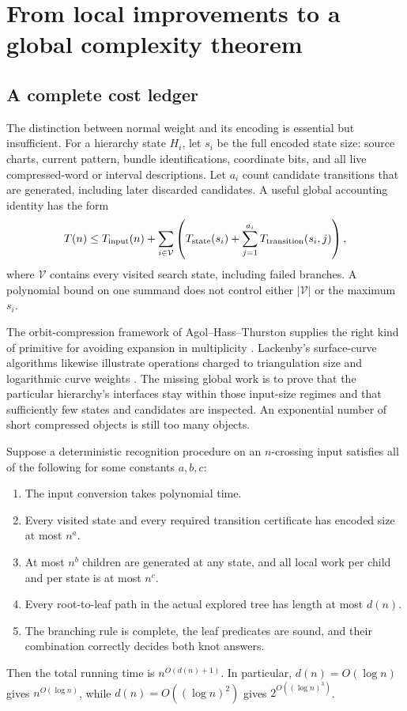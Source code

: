 \section{From local improvements to a global complexity theorem}
\label{sec:global}

\subsection{A complete cost ledger}

The distinction between normal weight and its encoding is essential but
insufficient. For a hierarchy state $H_i$, let $s_i$ be the full encoded
state size: source charts, current pattern, bundle identifications,
coordinate bits, and all live compressed-word or interval descriptions.
Let $a_i$ count candidate transitions that are generated, including later
discarded candidates. A useful global accounting identity has the form
\[
 T(n)\le T_{\rm input}(n)+
 \sum_{i\in\mathcal V}
 \left(T_{\rm state}(s_i)+
       \sum_{j=1}^{a_i}T_{\rm transition}(s_i,j)\right),
\]
where $\mathcal V$ contains every visited search state, including failed
branches. A polynomial bound on one summand does not control either
$|\mathcal V|$ or the maximum $s_i$.

The orbit-compression framework of Agol--Hass--Thurston supplies the right
kind of primitive for avoiding expansion in multiplicity
\cite{aht2006}. Lackenby's surface-curve algorithms likewise illustrate
operations charged to triangulation size and logarithmic curve weights
\cite{lackenby-curves}. The missing global work is to prove that the
particular hierarchy's interfaces stay within those input-size regimes
and that sufficiently few states and candidates are inspected. An
exponential number of short compressed objects is still too many objects.

\begin{proposition}
\label{prop:global-ledger}
Suppose a deterministic recognition procedure on an $n$-crossing input
satisfies all of the following for some constants $a,b,c$:
\begin{enumerate}
\item The input conversion takes polynomial time.
\item Every visited state and every required transition certificate has
encoded size at most $n^a$.
\item At most $n^b$ children are generated at any state, and all local work
per child and per state is at most $n^c$.
\item Every root-to-leaf path in the actual explored tree has length at
most $d(n)$.
\item The branching rule is complete, the leaf predicates are sound, and
their combination correctly decides both knot answers.
\end{enumerate}
Then the total running time is $n^{O(d(n)+1)}$. In particular,
$d(n)=O(\log n)$ gives $n^{O(\log n)}$, while
$d(n)=O((\log n)^2)$ gives $2^{O((\log n)^3)}$.
\end{proposition}

